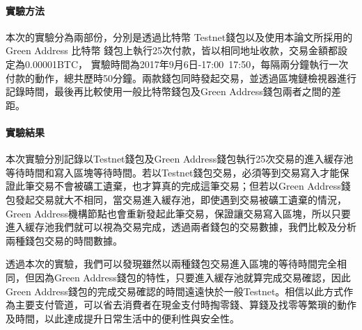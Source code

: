 			\paragraph{實驗方法}本次的實驗分為兩部份，分別是透過比特幣 Testnet錢包以及使用本論文所採用的Green Address 比特幣 錢包上執行25次付款，皆以相同地址收款，交易金額都設定為0.00001BTC， 實驗時間為2017年9月6日-17:00~17:50，每隔兩分鐘執行一次付款的動作，總共歷時50分鐘。兩款錢包同時發起交易，並透過區塊鏈檢視器進行記錄時間，最後再比較使用一般比特幣錢包及Green Address錢包兩者之間的差距。
			\paragraph{實驗結果}本次實驗分別記錄以Testnet錢包及Green Address錢包執行25次交易的進入緩存池等待時間和寫入區塊等待時間。若以Testnet錢包交易，必須等到交易寫入才能保證此筆交易不會被礦工遺棄，也才算真的完成這筆交易；但若以Green Address錢包發起交易就大不相同，當交易進入緩存池，即使遇到交易被礦工遺棄的情況，Green Address機構節點也會重新發起此筆交易，保證讓交易寫入區塊，所以只要進入緩存池我們就可以視為交易完成，透過兩者錢包的交易數據，我們比較及分析兩種錢包交易的時間數據。


透過本次的實驗，我們可以發現雖然以兩種錢包交易進入區塊的等待時間完全相同，但因為Green Address錢包的特性，只要進入緩存池就算完成交易確認，因此Green Address錢包的完成交易確認的時間遠遠快於一般Testnet。相信以此⽅式作為主要⽀付管道，可以省去消費者在現金⽀付時掏零錢、算錢及找零等繁瑣的動作及時間，以此達成提升⽇常⽣活中的便利性與安全性。